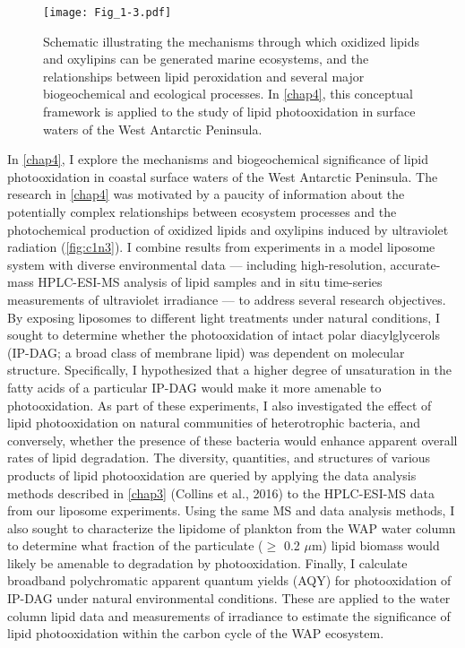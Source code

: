 \begin{figure}[!th]
\centering
\texttt{[image: Fig\_1-3.pdf]}
\caption[Schematic illustrating the mechanisms through which oxidized lipids and oxylipins can be generated marine ecosystems, and the relationships between lipid peroxidation and several major biogeochemical and ecological processes.]{Schematic illustrating the mechanisms through which oxidized lipids and oxylipins can be generated marine ecosystems, and the relationships between lipid peroxidation and several major biogeochemical and ecological processes. In \autoref{chap4}, this conceptual framework is applied to the study of lipid photooxidation in surface waters of the West Antarctic Peninsula.
}
\label{fig:c1n3}
\end{figure}

In \autoref{chap4}, I explore the mechanisms and biogeochemical significance of lipid photooxidation in coastal surface waters of the West Antarctic Peninsula. The research in \autoref{chap4} was motivated by a paucity of information about the potentially complex relationships between ecosystem processes and the photochemical production of oxidized lipids and oxylipins induced by ultraviolet radiation (\autoref{fig:c1n3}). I combine results from experiments in a model liposome system with diverse environmental data --- including high-resolution, accurate-mass HPLC-ESI-MS analysis of lipid samples and in situ time-series measurements of ultraviolet irradiance --- to address several research objectives. By exposing liposomes to different light treatments under natural conditions, I sought to determine whether the photooxidation of intact polar diacylglycerols (IP-DAG; a broad class of membrane lipid) was dependent on molecular structure. Specifically, I hypothesized that a higher degree of unsaturation in the fatty acids of a particular IP-DAG would make it more amenable to photooxidation. As part of these experiments, I also investigated the effect of lipid photooxidation on natural communities of heterotrophic bacteria, and conversely, whether the presence of these bacteria would enhance apparent overall rates of lipid degradation. The diversity, quantities, and structures of various products of lipid photooxidation are queried by applying the data analysis methods described in \autoref{chap3} (Collins et al., 2016) to the HPLC-ESI-MS data from our liposome experiments. Using the same MS and data analysis methods, I also sought to characterize the lipidome of plankton from the WAP water column to determine what fraction of the particulate ($\geq$ 0.2 $\mu$m) lipid biomass would likely be amenable to degradation by photooxidation. Finally, I calculate broadband polychromatic apparent quantum yields (AQY) for photooxidation of IP-DAG under natural environmental conditions. These are applied to the water column lipid data and measurements of irradiance to estimate the significance of lipid photooxidation within the carbon cycle of the WAP ecosystem.

